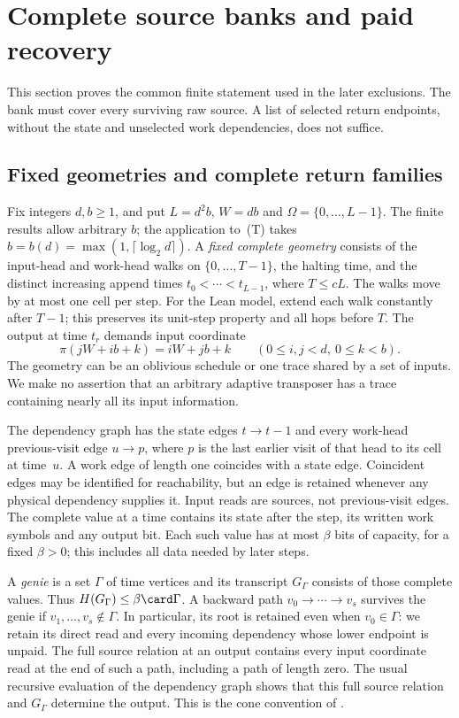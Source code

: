 \section{Complete source banks and paid recovery}\label{sec:source-engine}

This section proves the common finite statement used in the later exclusions.
The bank must cover every surviving raw source. A list of selected return
endpoints, without the state and unselected work dependencies, does not suffice.

\subsection{Fixed geometries and complete return families}

Fix integers $d,b\ge1$, and put $L=d^2b$, $W=db$ and
$\Omega=\{0,\ldots,L-1\}$. The finite results allow arbitrary $b$; the
application to~(T) takes $b=b(d)=\max(1,\lceil\log_2d\rceil)$. A
\emph{fixed complete geometry} consists of the input-head and work-head
walks on $\{0,\ldots,T-1\}$, the halting time, and the distinct increasing
append times $t_0<\cdots<t_{L-1}$, where $T\le cL$. The walks move by at
most one cell per step. For the Lean model, extend each walk constantly
after $T-1$; this preserves its unit-step property and all hops before $T$.
The output at time $t_r$ demands input coordinate
\begin{equation}\label{eq:transpose-demand}
 \pi(jW+ib+k)=iW+jb+k
 \qquad(0\le i,j<d,\ 0\le k<b).
\end{equation}
The geometry can be an oblivious schedule or one trace shared by a set
of inputs. We make no assertion that an arbitrary adaptive transposer has
a trace containing nearly all its input information.

The dependency graph has the state edges $t\to t-1$ and every work-head
previous-visit edge $u\to p$, where $p$ is the last earlier visit of that
head to its cell at time~$u$. A work edge of length one coincides with a
state edge. Coincident edges may be identified for reachability, but an
edge is retained whenever any physical dependency supplies it. Input
reads are sources, not previous-visit edges. The complete value at a time
contains its state after the step, its written work symbols and any output
bit. Each such value has at most $\beta$ bits of capacity, for a fixed
$\beta>0$; this includes all data needed by later steps.

A \emph{genie} is a set $\Gamma$ of time vertices and its transcript
$G_\Gamma$ consists of those complete values. Thus
$H(G_\Gamma)\le\beta\card\Gamma$. A backward path
$v_0\to\cdots\to v_s$ survives the genie if
$v_1,\ldots,v_s\notin\Gamma$. In particular, its root is retained even
when $v_0\in\Gamma$: we retain its direct read and every incoming
dependency whose lower endpoint is unpaid. The full source relation at
an output contains every input coordinate read at the end of such a path,
including a path of length zero. The usual recursive evaluation of the
dependency graph shows that this full source relation and $G_\Gamma$
determine the output. This is the cone convention of
\cite[Section~4.1]{FourthPaper2026}.

